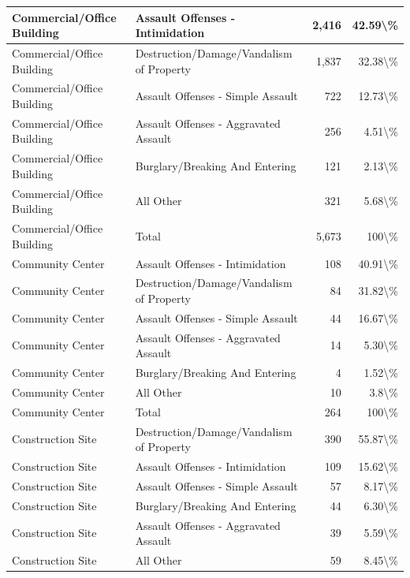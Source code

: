 \documentclass[
]{krantz}
\begin{document}
\begin{longtable}[t]{l|l|r|r}
\hline
Commercial/Office Building & Assault Offenses - Intimidation & 2,416 & 42.59\textbackslash{}\%\\
\hline
Commercial/Office Building & Destruction/Damage/Vandalism of Property & 1,837 & 32.38\textbackslash{}\%\\
\hline
Commercial/Office Building & Assault Offenses - Simple Assault & 722 & 12.73\textbackslash{}\%\\
\hline
Commercial/Office Building & Assault Offenses - Aggravated Assault & 256 & 4.51\textbackslash{}\%\\
\hline
Commercial/Office Building & Burglary/Breaking And Entering & 121 & 2.13\textbackslash{}\%\\
\hline
Commercial/Office Building & All Other & 321 & 5.68\textbackslash{}\%\\
\hline
Commercial/Office Building & Total & 5,673 & 100\textbackslash{}\%\\
\hline
Community Center & Assault Offenses - Intimidation & 108 & 40.91\textbackslash{}\%\\
\hline
Community Center & Destruction/Damage/Vandalism of Property & 84 & 31.82\textbackslash{}\%\\
\hline
Community Center & Assault Offenses - Simple Assault & 44 & 16.67\textbackslash{}\%\\
\hline
Community Center & Assault Offenses - Aggravated Assault & 14 & 5.30\textbackslash{}\%\\
\hline
Community Center & Burglary/Breaking And Entering & 4 & 1.52\textbackslash{}\%\\
\hline
Community Center & All Other & 10 & 3.8\textbackslash{}\%\\
\hline
Community Center & Total & 264 & 100\textbackslash{}\%\\
\hline
Construction Site & Destruction/Damage/Vandalism of Property & 390 & 55.87\textbackslash{}\%\\
\hline
Construction Site & Assault Offenses - Intimidation & 109 & 15.62\textbackslash{}\%\\
\hline
Construction Site & Assault Offenses - Simple Assault & 57 & 8.17\textbackslash{}\%\\
\hline
Construction Site & Burglary/Breaking And Entering & 44 & 6.30\textbackslash{}\%\\
\hline
Construction Site & Assault Offenses - Aggravated Assault & 39 & 5.59\textbackslash{}\%\\
\hline
Construction Site & All Other & 59 & 8.45\textbackslash{}\%\\

\end{longtable}
\end{document}
